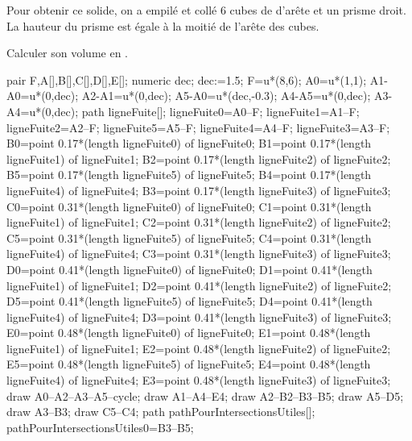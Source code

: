 \begin{corrige}
    Pour obtenir ce solide, on a empilé et collé \num{6} cubes de  d’arête et un prisme droit.
    La hauteur du prisme est égale à la moitié de l’arête des cubes.

    Calculer son volume en \Vol[cm]{}.

    \medskip
    \begin{Geometrie}
        pair F,A[],B[],C[],D[],E[];
        numeric dec;
        dec:=1.5;
        F=u*(8,6);
        A0=u*(1,1);
        A1-A0=u*(0,dec);
        A2-A1=u*(0,dec);
        A5-A0=u*(dec,-0.3);
        A4-A5=u*(0,dec);
        A3-A4=u*(0,dec);
        path ligneFuite[];
        ligneFuite0=A0--F;
        ligneFuite1=A1--F;
        ligneFuite2=A2--F;
        ligneFuite5=A5--F;
        ligneFuite4=A4--F;
        ligneFuite3=A3--F;
        B0=point 0.17*(length ligneFuite0) of ligneFuite0;
        B1=point 0.17*(length ligneFuite1) of ligneFuite1;
        B2=point 0.17*(length ligneFuite2) of ligneFuite2;
        B5=point 0.17*(length ligneFuite5) of ligneFuite5;
        B4=point 0.17*(length ligneFuite4) of ligneFuite4;
        B3=point 0.17*(length ligneFuite3) of ligneFuite3;
        C0=point 0.31*(length ligneFuite0) of ligneFuite0;
        C1=point 0.31*(length ligneFuite1) of ligneFuite1;
        C2=point 0.31*(length ligneFuite2) of ligneFuite2;
        C5=point 0.31*(length ligneFuite5) of ligneFuite5;
        C4=point 0.31*(length ligneFuite4) of ligneFuite4;
        C3=point 0.31*(length ligneFuite3) of ligneFuite3;
        D0=point 0.41*(length ligneFuite0) of ligneFuite0;
        D1=point 0.41*(length ligneFuite1) of ligneFuite1;
        D2=point 0.41*(length ligneFuite2) of ligneFuite2;
        D5=point 0.41*(length ligneFuite5) of ligneFuite5;
        D4=point 0.41*(length ligneFuite4) of ligneFuite4;
        D3=point 0.41*(length ligneFuite3) of ligneFuite3;
        E0=point 0.48*(length ligneFuite0) of ligneFuite0;
        E1=point 0.48*(length ligneFuite1) of ligneFuite1;
        E2=point 0.48*(length ligneFuite2) of ligneFuite2;
        E5=point 0.48*(length ligneFuite5) of ligneFuite5;
        E4=point 0.48*(length ligneFuite4) of ligneFuite4;
        E3=point 0.48*(length ligneFuite3) of ligneFuite3;        
        draw A0--A2--A3--A5--cycle;
        draw A1--A4--E4;
        draw A2--B2--B3--B5;
        draw A5--D5;
        draw A3--B3;
        draw C5--C4;                
        path pathPourIntersectionsUtiles[];
        pathPourIntersectionsUtiles0=B3--B5;

\end{Geometrie}
\end{corrige}
